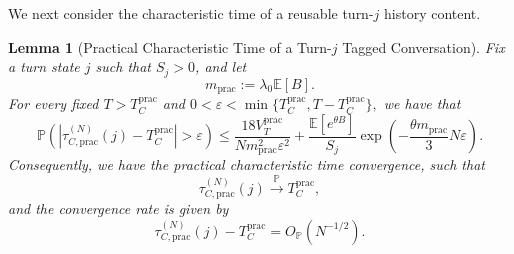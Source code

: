 \documentclass{article}
\newtheorem{lemma}[lemma]{Lemma}
\theoremstyle{definition}
\newcommand{\E}{\mathbb E}
\newcommand{\pro}{\mathbb P}
\begin{document}
We next consider the characteristic time of a reusable turn-$j$ history content.

\begin{lemma}[Practical Characteristic Time of a Turn-$j$ Tagged Conversation]
\label{lem: Practical Characteristic Time Turn-j}
    Fix a turn state $j$ such that $S_j>0$, and let
    \begin{equation*}
        m_{\mathrm{prac}}:=\lambda_0\E[B].
    \end{equation*}
    For every fixed $T>T_C^{\mathrm{prac}}$ and $0<\varepsilon<\min\{T_C^{\mathrm{prac}},T-T_C^{\mathrm{prac}}\},$ we have that
    \begin{equation}
    \label{equ: practical CT finite N bound}
        \pro\left(\left|\tau_{C,\mathrm{prac}}^{(N)}(j)-T_C^{\mathrm{prac}}\right|>\varepsilon\right) \leq \frac{18V_T^{\mathrm{prac}}}{Nm_{\mathrm{prac}}^2\varepsilon^2} + \frac{\E[e^{\theta B}]}{S_j} \exp\left(-\frac{\theta m_{\mathrm{prac}}}{3}N\varepsilon\right).
    \end{equation}
    Consequently, we have the practical characteristic time convergence, such that
    \begin{equation}
    \label{equ: practical CT convergence-2}
        \tau_{C,\mathrm{prac}}^{(N)}(j)\xrightarrow{\mathbb P}T_C^{\mathrm{prac}},
    \end{equation}
    and the convergence rate is given by
    \begin{equation}
    \label{equ: practical CT rate}
        \tau_{C,\mathrm{prac}}^{(N)}(j)-T_C^{\mathrm{prac}}=O_{\mathbb P}(N^{-1/2}).
    \end{equation}
\end{lemma}
\end{document}
